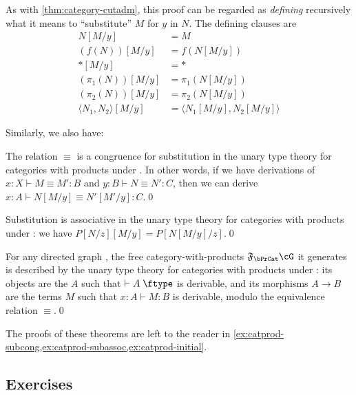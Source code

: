 \documentclass{book}
\let\types\vdash
\def\type{\;\ftype}
\newcommand{\F}[1]{\mathfrak{F}_{#1}}
\def\ttt{\mathord{\ast}}%
\def\pair#1#2{\langle #1,#2\rangle}
\begin{document}
As with \cref{thm:category-cutadm}, this proof can be regarded as \emph{defining} recursively what it means to ``substitute'' $M$ for $y$ in $N$.
The defining clauses are
\begin{align*}
  N[M/y] &= M\\
  (f(N))[M/y] &= f(N[M/y])\\
  \ttt[M/y] &= \ttt\\
  (\pi_1(N))[M/y] &= \pi_1(N[M/y])\\
  (\pi_2(N))[M/y] &= \pi_2(N[M/y])\\
  \pair{N_1}{N_2}[M/y] &= \pair{N_1[M/y]}{N_2[M/y]}
\end{align*}

Similarly, we also have:

\begin{thm}\label{thm:catprod-subcong}
  The relation $\equiv$ is a congruence for substitution in the unary type theory for categories with products under \cG.
  In other words, if we have derivations of $x:X \types M\equiv M':B$ and $y:B \types N\equiv N':C$, then we can derive $x:A \types N[M/y] \equiv N'[M'/y]:C$.\qed
\end{thm}

\begin{thm}\label{thm:catprod-subassoc}
  Substitution is associative in the unary type theory for categories with products under \cG: we have $P[N/z][M/y] = P[N[M/y]/z]$.\qed
\end{thm}

\begin{thm}\label{thm:catprod-initial}
  For any directed graph \cG, the free category-with-products $\F\bPrCat \cG$ it generates is described by the unary type theory for categories with products under \cG: its objects are the $A$ such that $\types A\type$ is derivable, and its morphisms $A\to B$ are the terms $M$ such that $x:A \types M:B$ is derivable, modulo the equivalence relation $\equiv$.\qed
\end{thm}

The proofs of these theorems are left to the reader in \cref{ex:catprod-subcong,ex:catprod-subassoc,ex:catprod-initial}.

\subsection*{Exercises}
\end{document}
